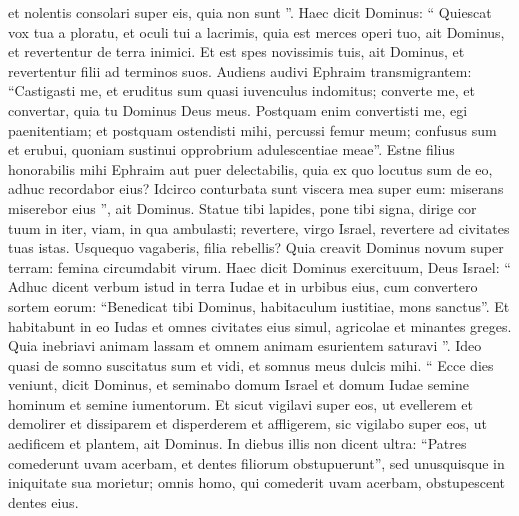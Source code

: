 \begin{biblechapter}
\begin{biblechapter}
\begin{biblechapter}
\begin{biblechapter}
\begin{biblechapter}
\begin{biblechapter}
\begin{biblechapter}
\begin{biblechapter}
\begin{biblechapter}
\begin{biblechapter}
\begin{biblechapter}
\begin{biblechapter}
\begin{biblechapter}
\begin{biblechapter}
\begin{biblechapter}
\begin{biblechapter}
\begin{biblechapter}
\begin{biblechapter}
\begin{biblechapter}
\begin{biblechapter}
\begin{biblechapter}
\begin{biblechapter}
\begin{biblechapter}
\begin{biblechapter}
\begin{biblechapter}
\begin{biblechapter}
\begin{biblechapter}
\begin{biblechapter}
\begin{biblechapter}
\begin{biblechapter}
\begin{biblechapter}
 et nolentis consolari super eis, quia non sunt ”.
 \verse Haec dicit Dominus:
 “ Quiescat vox tua a ploratu,
 et oculi tui a lacrimis,
 quia est merces operi tuo,
 ait Dominus,
 et revertentur de terra inimici.
 \verse Et est spes novissimis tuis,
 ait Dominus,
 et revertentur filii ad terminos suos.
 \verse Audiens audivi Ephraim transmigrantem:
 “Castigasti me, et eruditus sum
 quasi iuvenculus indomitus;
 converte me, et convertar,
 quia tu Dominus Deus meus.
 \verse Postquam enim convertisti me,
 egi paenitentiam;
 et postquam ostendisti mihi,
 percussi femur meum;
 confusus sum et erubui,
 quoniam sustinui opprobrium adulescentiae meae”.
 \verse Estne filius honorabilis mihi Ephraim
 aut puer delectabilis,
 quia ex quo locutus sum de eo,
 adhuc recordabor eius?
 Idcirco conturbata sunt viscera mea super eum:
 miserans miserebor eius ”,
 ait Dominus.
 \verse Statue tibi lapides,
 pone tibi signa,
 dirige cor tuum in iter,
 viam, in qua ambulasti;
 revertere, virgo Israel,
 revertere ad civitates tuas istas.
 \verse Usquequo vagaberis,
 filia rebellis?
 Quia creavit Dominus novum super terram:
 femina circumdabit virum.
 \verse Haec dicit Dominus exercituum, Deus Israel: “ Adhuc dicent verbum istud in terra Iudae et in urbibus eius, cum convertero sortem eorum: “Benedicat tibi Dominus, habitaculum iustitiae, mons sanctus”. 
\verse Et habitabunt in eo Iudas et omnes civitates eius simul, agricolae et minantes greges. 
\verse Quia inebriavi animam lassam et omnem animam esurientem saturavi ”.
 \verse Ideo quasi de somno suscitatus sum et vidi, et somnus meus dulcis mihi.
 \verse “ Ecce dies veniunt, dicit Dominus, et seminabo domum Israel et domum Iudae semine hominum et semine iumentorum. 
\verse Et sicut vigilavi super eos, ut evellerem et demolirer et dissiparem et disperderem et affligerem, sic vigilabo super eos, ut aedificem et plantem, ait Dominus.
 \verse In diebus illis non dicent ultra:
 “Patres comederunt uvam acerbam, et dentes filiorum obstupuerunt”,
 \verse sed unusquisque in iniquitate sua morietur; omnis homo, qui comederit uvam acerbam, obstupescent dentes eius.

\end{biblechapter}
\end{biblechapter}
\end{biblechapter}
\end{biblechapter}
\end{biblechapter}
\end{biblechapter}
\end{biblechapter}
\end{biblechapter}
\end{biblechapter}
\end{biblechapter}
\end{biblechapter}
\end{biblechapter}
\end{biblechapter}
\end{biblechapter}
\end{biblechapter}
\end{biblechapter}
\end{biblechapter}
\end{biblechapter}
\end{biblechapter}
\end{biblechapter}
\end{biblechapter}
\end{biblechapter}
\end{biblechapter}
\end{biblechapter}
\end{biblechapter}
\end{biblechapter}
\end{biblechapter}
\end{biblechapter}
\end{biblechapter}
\end{biblechapter}
\end{biblechapter}

